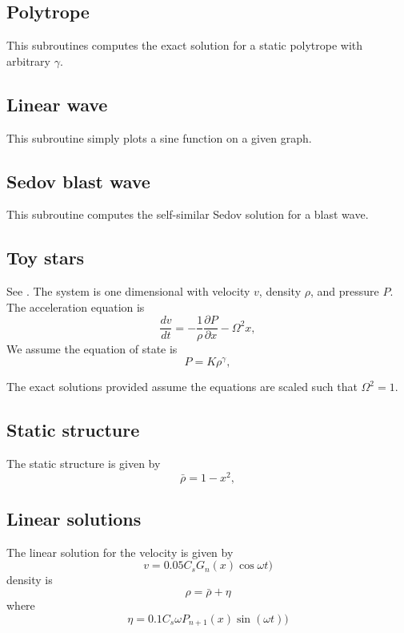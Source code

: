 \documentclass[a4paper,12pt]{article}
\begin{document}
\subsection{Polytrope}
 This subroutines computes the exact solution for a static polytrope with
arbitrary $\gamma$.

\subsection{Linear wave}
 This subroutine simply plots a sine function on a given graph.

\subsection{Sedov blast wave}
 This subroutine computes the self-similar Sedov solution for a blast wave.

\subsection{Toy stars}
 See \citet{mp04}. The system is one dimensional with velocity $v$, density $\rho$, and pressure
$P$. The acceleration equation is 
\begin{equation}
\frac{dv}{dt} = - \frac{1}{\rho} \frac{\partial P}{\partial x}  - \Omega^2 x,
\end{equation}
 We assume the equation of state is 
\begin{equation}
P = K \rho^\gamma,
\end{equation} 

 The exact solutions provided assume the equations are scaled such that
$\Omega^2 = 1$.
 
\subsection{Static structure}
The static structure is given by
\begin{equation}
\bar \rho = 1- x^2,
\end{equation}

\subsection{Linear solutions}
The linear solution for the velocity is given by
\begin{equation}
v = 0.05 C_s G_n(x) \cos{\omega t} )
\end{equation}
density is
\begin{equation}
\rho = \bar{\rho} + \eta
\end{equation}
where 
\begin{equation}
\eta = 0.1 C_s \omega P_{n+1}(x) \sin{(\omega t)})
\end{equation}
\end{document}
